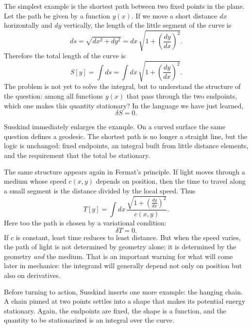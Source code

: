 The simplest example is the shortest path between two fixed points in the plane. Let the path be given by a function \(y(x)\). If we move a short distance \(dx\) horizontally and \(dy\) vertically, the length of the little segment of the curve is
\begin{equation}
ds=\sqrt{dx^2+dy^2}=dx\,\sqrt{1+\left(\frac{dy}{dx}\right)^2}.
\end{equation}
Therefore the total length of the curve is
\begin{equation}
S[y]=\int ds=\int dx\,\sqrt{1+\left(\frac{dy}{dx}\right)^2}.
\end{equation}
The problem is not yet to solve the integral, but to understand the structure of the question: among all functions \(y(x)\) that pass through the two endpoints, which one makes this quantity stationary? In the language we have just learned,
\begin{equation}
\delta S=0.
\end{equation}

Susskind immediately enlarges the example. On a curved surface the same question defines a geodesic. The shortest path is no longer a straight line, but the logic is unchanged: fixed endpoints, an integral built from little distance elements, and the requirement that the total be stationary.

The same structure appears again in Fermat's principle. If light moves through a medium whose speed \(c(x,y)\) depends on position, then the time to travel along a small segment is the distance divided by the local speed. Thus
\begin{equation}
T[y]=\int dx\,\frac{\sqrt{1+\left(\frac{dy}{dx}\right)^2}}{c(x,y)}.
\end{equation}
Here too the path is chosen by a variational condition:
\begin{equation}
\delta T=0.
\end{equation}
If \(c\) is constant, least time reduces to least distance. But when the speed varies, the path of light is not determined by geometry alone; it is determined by the geometry \emph{and} the medium. That is an important warning for what will come later in mechanics: the integrand will generally depend not only on position but also on derivatives.

Before turning to action, Susskind inserts one more example: the hanging chain. A chain pinned at two points settles into a shape that makes its potential energy stationary. Again, the endpoints are fixed, the shape is a function, and the quantity to be stationarized is an integral over the curve.

